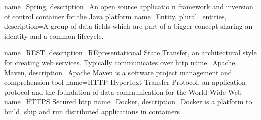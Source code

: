 {
  name={Spring},
  description={An open source applicatio	n framework and inversion of control container for the Java platform}
}
{
	name={Entity},
	plural={entities},
	description={A group of data fields which are part of a bigger concept sharing an identity and a common lifecycle.\cite{evans2003domain}}
}

{
  name={REST},
  description={REpresentational State Transfer, an architectural style for creating web services. Typically communicates over \gls{http}}
}
{
  name={Apache Maven},
  description={Apache Maven is a software project management and comprehension tool}
}
{
  name={HTTP}
}
{
	Hypertext Transfer Protocol, an application protocol and the foundation of data communication for the World Wide Web \cite{http_wikipedia}
}
{
  name={HTTPS}
}
{
	Secured \gls{http}
}
{
  name={Docker},
  description={Docker is a platform to build, ship and run distributed applications in containers}
}



